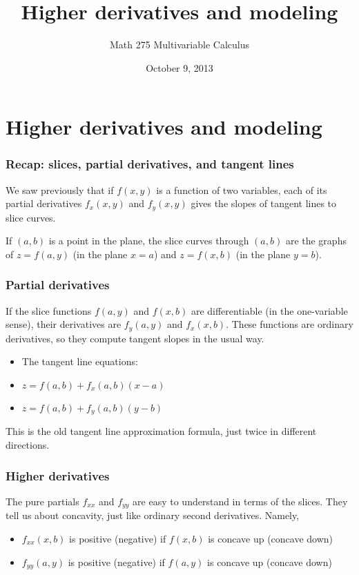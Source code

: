 \documentclass[11pt,ignorenonframetext,aspectratio=169,xcolor={svgnames}]{beamer}
\title{Higher derivatives and modeling}
\author{Math 275 Multivariable Calculus}
\date{October 9, 2013}
\begin{document}
\frame{\titlepage}

\section{Higher derivatives and modeling}

\begin{frame}\frametitle{Recap: slices, partial derivatives, and tangent
lines}

We saw previously that if $f(x,y)$ is a function of two variables, each
of its partial derivatives $f_x(x,y)$ and $f_y(x,y)$ gives the slopes of
tangent lines to slice curves.

If $(a, b)$ is a point in the plane, the slice curves through $(a,b)$
are the graphs of $z = f(a, y)$ (in the plane $x = a$) and $z = f(x, b)$
(in the plane $y = b$).

\end{frame}

\begin{frame}\frametitle{Partial derivatives}

If the slice functions $f(a, y)$ and $f(x,b)$ are differentiable (in the
one-variable sense), their derivatives are $f_y(a,y)$ and $f_x(x,b)$.
These functions are ordinary derivatives, so they compute tangent slopes
in the usual way.

\begin{itemize}

\item
  The tangent line equations:
\item
  $z = f(a, b) + f_x(a,b)(x - a)$
\item
  $z = f(a, b) + f_y(a,b)(y - b)$
\end{itemize}

This is the old tangent line approximation formula, just twice in
different directions.

\end{frame}

\begin{frame}\frametitle{Higher derivatives}

The pure partials $f_{xx}$ and $f_{yy}$ are easy to understand in terms
of the slices. They tell us about concavity, just like ordinary second
derivatives. Namely,

\begin{itemize}

\item
  $f_{xx}(x,b)$ is positive (negative) if $f(x,b)$ is concave up
  (concave down)
\item
  $f_{yy}(a,y)$ is positive (negative) if $f(a,y)$ is concave up
  (concave down)
\end{itemize}

\end{frame}
\end{document}
